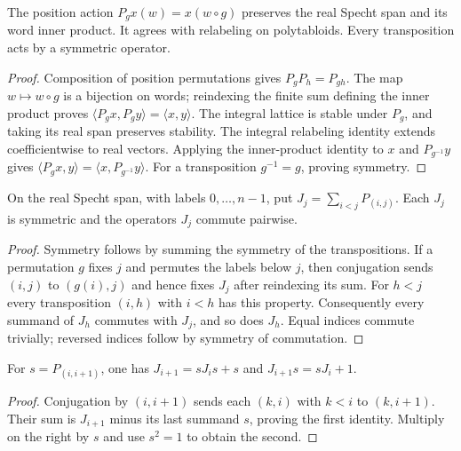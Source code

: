 \begin{lemma}
\label{lem:real-specht-action}
\leanok
The position action $P_gx(w)=x(w\circ g)$ preserves the real
Specht span and its word inner product. It agrees with relabeling
on polytabloids. Every transposition acts by a symmetric operator.
\end{lemma}
\begin{proof}
Composition of position permutations gives $P_gP_h=P_{gh}$.
The map $w\mapsto w\circ g$ is a bijection on words; reindexing
the finite sum defining the inner product proves
$\langle P_gx,P_gy\rangle=\langle x,y\rangle$.
The integral lattice is stable under $P_g$, and taking its real
span preserves stability. The integral relabeling identity extends
coefficientwise to real vectors. Applying the inner-product identity
to $x$ and $P_{g^{-1}}y$ gives
$\langle P_gx,y\rangle=\langle x,P_{g^{-1}}y\rangle$.
For a transposition $g^{-1}=g$, proving symmetry.
\end{proof}

\begin{lemma}
\label{lem:murphy-operators}
\leanok
On the real Specht span, with labels $0,\ldots,n-1$, put
$J_j=\sum_{i<j}P_{(i,j)}$. Each $J_j$ is symmetric and the
operators $J_j$ commute pairwise.
\end{lemma}
\begin{proof}
Symmetry follows by summing the symmetry of the transpositions.
If a permutation $g$ fixes $j$ and permutes the labels below $j$,
then conjugation sends $(i,j)$ to $(g(i),j)$ and hence fixes $J_j$
after reindexing its sum. For $h<j$ every transposition $(i,h)$
with $i<h$ has this property. Consequently every summand of $J_h$
commutes with $J_j$, and so does $J_h$. Equal indices commute
trivially; reversed indices follow by symmetry of commutation.
\end{proof}

\begin{lemma}
\label{lem:murphy-recurrence}
\leanok
For $s=P_{(i,i+1)}$, one has $J_{i+1}=sJ_i s+s$ and
$J_{i+1}s=sJ_i+1$.
\end{lemma}
\begin{proof}
Conjugation by $(i,i+1)$ sends each $(k,i)$ with $k<i$ to
$(k,i+1)$. Their sum is $J_{i+1}$ minus its last summand $s$,
proving the first identity. Multiply on the right by $s$ and use
$s^2=1$ to obtain the second.
\end{proof}

